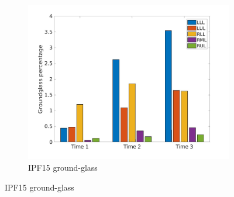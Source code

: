 \begin{figure}[H] 
\centering
\begin{subfigure}{.46\linewidth}%
  \includegraphics[width=\linewidth,trim={{.0\wd0} {.0\wd0} {.0\wd0} {.0\wd0}},clip]{Appendix/Image_AppexA/LobarDistribution/IPF15GroundglassLobarRegionDiseaseDistributionOverTime.jpg} %
  \caption{IPF15 ground-glass}
  \label{fig:IPF15LobarRegionDiseaseDistributionOverTime-a} 
\end{subfigure} 
\hspace{.3in}

\end{figure}
